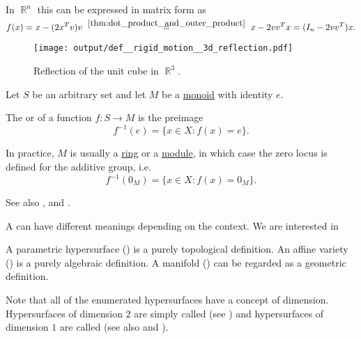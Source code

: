 \begin{definition}
\begin{thmenum}
    In \( \BbbR^n \) this can be expressed in matrix form as
    \begin{equation*}
      f(x)
      =
      x - (2 x^T v) v
      \reloset {\ref{thm:dot_product_and_outer_product}} =
      x - 2 v v^T x
      =
      (I_n - 2 v v^T) x.
    \end{equation*}

    \begin{figure}[!ht]
      \centering
      \texttt{[image: output/def\_\_rigid\_motion\_\_3d\_reflection.pdf]}
      \caption{Reflection of the unit cube in \( \BbbR^3 \).}\label{fig:def/rigid_motion/3d_rotation}
    \end{figure}
  \end{thmenum}
\end{definition}

\begin{definition}\label{def:zero_locus}
  Let \( S \) be an arbitrary set and let \( M \) be a \hyperref[def:monoid]{monoid} with identity \( e \).

  The  or  of a function \( f: S \to M \) is the preimage
  \begin{equation*}
    f^{-1}(e) = \{ x \in X \colon f(x) = e \}.
  \end{equation*}

  In practice, \( M \) is usually a \hyperref[def:ring]{ring} or a \hyperref[def:module]{module}, in which case the zero locus is defined for the additive group, i.e.
  \begin{equation*}
    f^{-1}(0_M) = \{ x \in X \colon f(x) = 0_M \}.
  \end{equation*}

  See also ,  and .
\end{definition}

\begin{definition}\label{def:hypersurface}
  A  can have different meanings depending on the context. We are interested in

  \begin{thmenum}
     A parametric hypersurface () is a purely topological definition.
     An affine variety () is a purely algebraic definition.
     A manifold () can be regarded as a geometric definition.
  \end{thmenum}

  Note that all of the enumerated hypersurfaces have a concept of dimension. Hypersurfaces of dimension \( 2 \) are simply called  (see ) and hypersurfaces of dimension \( 1 \) are called  (see also  and ).
\end{definition}

